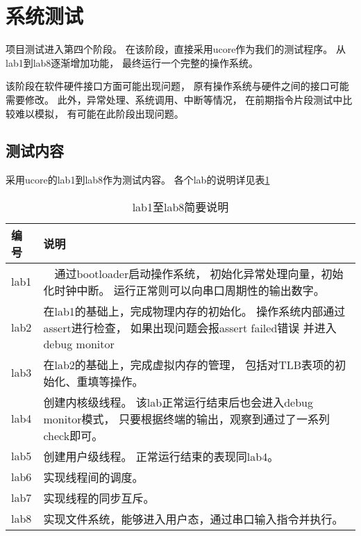\section{系统测试}
    项目测试进入第四个阶段。%
    在该阶段，直接采用ucore作为我们的测试程序。%
    从lab1到lab8逐渐增加功能，%
    最终运行一个完整的操作系统。

    该阶段在软件硬件接口方面可能出现问题，%
    原有操作系统与硬件之间的接口可能需要修改。%
    此外，异常处理、系统调用、中断等情况，%
    在前期指令片段测试中比较难以模拟，%
    有可能在此阶段出现问题。

    \subsection{测试内容}
        采用ucore的lab1到lab8作为测试内容。
        各个lab的说明详见表\ref{os_lab}
        \begin{table}[!hbp]
            \centering
            \caption{lab1至lab8简要说明}
            \label{os_lab}
            \begin{tabularx}{\textwidth}{|l|X|}
            \hline
            编号 & 说明 \\
            \hline
            lab1 &　通过bootloader启动操作系统，
                    初始化异常处理向量，初始化时钟中断。
                    运行正常则可以向串口周期性的输出数字。 \\
            \hline
            lab2 & 在lab1的基础上，完成物理内存的初始化。
                    操作系统内部通过assert进行检查，
                    如果出现问题会报assert failed错误
                    并进入debug monitor    \\
            \hline
            lab3 & 在lab2的基础上，完成虚拟内存的管理，
                    包括对TLB表项的初始化、重填等操作。 \\
            \hline
            lab4 & 创建内核级线程。
                    该lab正常运行结束后也会进入debug monitor模式，
                    只要根据终端的输出，观察到通过了一系列check即可。 \\
            \hline
            lab5 & 创建用户级线程。
                    正常运行结束的表现同lab4。 \\
            \hline
            lab6 & 实现线程间的调度。    \\
            \hline
            lab7 & 实现线程的同步互斥。   \\
            \hline
            lab8 & 实现文件系统，能够进入用户态，通过串口输入指令并执行。  \\
            \hline
            \end{tabularx}
            \end{table}


